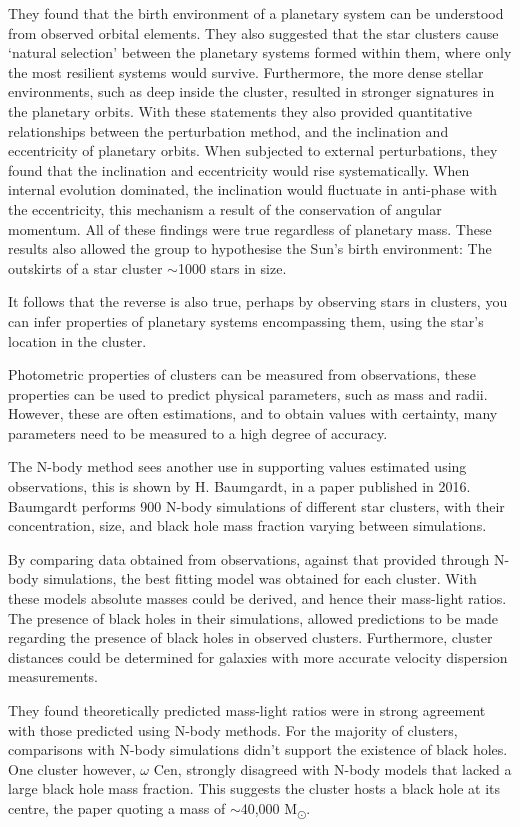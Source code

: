\documentclass[a4paper,10pt]{article}
\begin{document}
They found that the birth environment of a planetary system can be understood from observed orbital elements. They also suggested that the star clusters cause `natural selection' between the planetary systems formed within them, where only the most resilient systems would survive. Furthermore, the more dense stellar environments, such as deep inside the cluster, resulted in stronger signatures in the planetary orbits. With these statements they also provided quantitative relationships between the perturbation method, and the inclination and eccentricity of planetary orbits. When subjected to external perturbations, they found that the inclination and eccentricity would rise systematically. When internal evolution dominated, the inclination would fluctuate in anti-phase with the eccentricity, this mechanism a result of the conservation of angular momentum. All of these findings were true regardless of planetary mass. These results also allowed the group to hypothesise the Sun's birth environment: The outskirts of a star cluster $\sim$1000 stars in size.

It follows that the reverse is also true, perhaps by observing stars in clusters, you can infer properties of planetary systems encompassing them, using the star's location in the cluster. 

Photometric properties of clusters can be measured from observations, these properties can be used to predict physical parameters, such as mass and radii. However, these are often estimations, and to obtain values with certainty, many parameters need to be measured to a high degree of accuracy.

The N-body method sees another use in supporting values estimated using observations, this is shown by H. Baumgardt, in a paper published in 2016\cite{Baumgardt}. Baumgardt performs 900 N-body simulations of different star clusters, with their concentration, size, and black hole mass fraction varying between simulations. 

By comparing data obtained from observations, against that provided through N-body simulations, the best fitting model was obtained for each cluster. With these models absolute masses could be derived, and hence their mass-light ratios. The presence of black holes in their simulations, allowed predictions to be made regarding the presence of black holes in observed clusters. Furthermore, cluster distances could be determined for galaxies with more accurate velocity dispersion measurements.

They found theoretically predicted mass-light ratios were in strong agreement with those predicted using N-body methods. For the majority of clusters, comparisons with N-body simulations didn't support the existence of black holes. One cluster however, $\omega$ Cen, strongly disagreed with N-body models that lacked a large black hole mass fraction. This suggests the cluster hosts a black hole at its centre, the paper quoting a mass of $\sim$40,000 M\textsubscript{\(\odot\)}.
\end{document}
